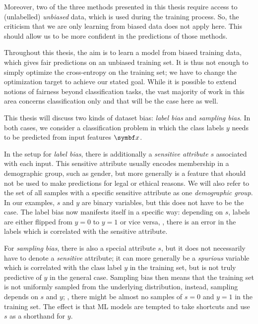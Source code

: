 Moreover, two of the three methods presented in this thesis require access to (unlabelled) \emph{unbiased} data,
which is used during the training process.
So, the criticism that we are only learning from biased data does not apply here.
This should allow us to be more confident in the predictions of those methods.

Throughout this thesis, the aim is to learn a model from biased training data,
which gives fair predictions on an unbiased training set.
It is thus not enough to simply optimize the cross-entropy on the training set;
we have to change the optimization target to achieve our stated goal.
While it is possible to extend notions of fairness beyond classification tasks,
the vast majority of work in this area concerns classification only and that will be the case here as well.

This thesis will discuss two kinds of dataset bias: \emph{label bias} and \emph{sampling bias}.
In both cases,
we consider a classification problem in which the class labels $y$ needs to be predicted from input features $\vx$.

In the setup for \emph{label bias},
there is additionally a \emph{sensitive attribute} $s$ associated with each input.
This sensitive attribute usually encodes membership in a demographic group, such as gender,
but more generally is a feature that should not be used to make predictions for legal or ethical reasons.
We will also refer to the set of all samples with a specific sensitive attribute as one \emph{demographic group}.
In our examples, $s$ and $y$ are binary variables, but this does not have to be the case.
The label bias now manifests itself in a specific way:
depending on $s$, labels are either flipped from $y=0$ to $y=1$ or vice versa,
\ie, there is an error in the labels which is correlated with the sensitive attribute.

For \emph{sampling bias},
there is also a special attribute $s$, but it does not necessarily have to denote a \emph{sensitive} attribute;
it can more generally be a \emph{spurious} variable which is correlated with the class label $y$ in the training set,
but is not truly predictive of $y$ in the general case.
Sampling bias then means that the training set is not uniformly sampled from the underlying distribution,
instead, sampling depends on $s$ and $y$;
\eg, there might be almost no samples of $s=0$ and $y=1$ in the training set.
The effect is that \ac{ML} models are tempted to take shortcuts and use $s$ as a shorthand for $y$.

